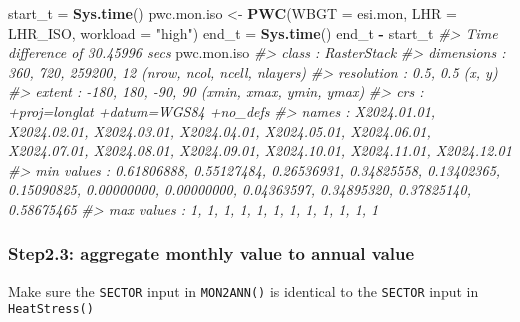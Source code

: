 \documentclass[
]{article}
\newenvironment{Shaded}{\begin{snugshade}}{\end{snugshade}}
\newcommand{\AttributeTok}[1]{\textcolor[rgb]{0.13,0.29,0.53}{#1}}
\newcommand{\CommentTok}[1]{\textcolor[rgb]{0.56,0.35,0.01}{\textit{#1}}}
\newcommand{\FunctionTok}[1]{\textcolor[rgb]{0.13,0.29,0.53}{\textbf{#1}}}
\newcommand{\NormalTok}[1]{#1}
\newcommand{\OtherTok}[1]{\textcolor[rgb]{0.56,0.35,0.01}{#1}}
\newcommand{\SpecialCharTok}[1]{\textcolor[rgb]{0.81,0.36,0.00}{\textbf{#1}}}
\newcommand{\StringTok}[1]{\textcolor[rgb]{0.31,0.60,0.02}{#1}}
\begin{document}
\begin{Shaded}
\begin{Highlighting}[]
\NormalTok{start\_t }\OtherTok{=} \FunctionTok{Sys.time}\NormalTok{()}
\NormalTok{pwc.mon.iso }\OtherTok{\textless{}{-}} \FunctionTok{PWC}\NormalTok{(}\AttributeTok{WBGT =}\NormalTok{ esi.mon,  }\AttributeTok{LHR =}\NormalTok{ LHR\_ISO, }\AttributeTok{workload =} \StringTok{"high"}\NormalTok{)}
\NormalTok{end\_t }\OtherTok{=} \FunctionTok{Sys.time}\NormalTok{()}
\NormalTok{end\_t }\SpecialCharTok{{-}}\NormalTok{ start\_t}
\CommentTok{\#\textgreater{} Time difference of 30.45996 secs}
\NormalTok{pwc.mon.iso}
\CommentTok{\#\textgreater{} class      : RasterStack }
\CommentTok{\#\textgreater{} dimensions : 360, 720, 259200, 12  (nrow, ncol, ncell, nlayers)}
\CommentTok{\#\textgreater{} resolution : 0.5, 0.5  (x, y)}
\CommentTok{\#\textgreater{} extent     : {-}180, 180, {-}90, 90  (xmin, xmax, ymin, ymax)}
\CommentTok{\#\textgreater{} crs        : +proj=longlat +datum=WGS84 +no\_defs }
\CommentTok{\#\textgreater{} names      : X2024.01.01, X2024.02.01, X2024.03.01, X2024.04.01, X2024.05.01, X2024.06.01, X2024.07.01, X2024.08.01, X2024.09.01, X2024.10.01, X2024.11.01, X2024.12.01 }
\CommentTok{\#\textgreater{} min values :  0.61806888,  0.55127484,  0.26536931,  0.34825558,  0.13402365,  0.15090825,  0.00000000,  0.00000000,  0.04363597,  0.34895320,  0.37825140,  0.58675465 }
\CommentTok{\#\textgreater{} max values :           1,           1,           1,           1,           1,           1,           1,           1,           1,           1,           1,           1}
\end{Highlighting}
\end{Shaded}

\subsubsection{Step2.3: aggregate monthly value to annual
value}\label{step2.3-aggregate-monthly-value-to-annual-value}

Make sure the \texttt{SECTOR} input in \texttt{MON2ANN()} is identical
to the \texttt{SECTOR} input in \texttt{HeatStress()}
\end{document}
